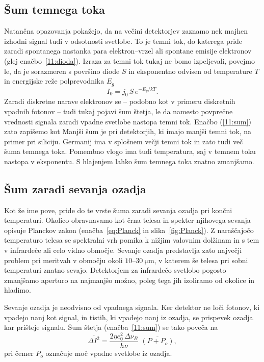\subsection*{Šum temnega toka} 
Natančna opazovanja pokažejo, da na večini detektorjev zaznamo nek majhen izhodni 
signal tudi v odsotnosti svetlobe. 
To je temni tok, do katerega pride zaradi
spontanega nastanka para elektron--vrzel ali spontane emisije elektronov 
(glej enačbo~\ref{11:dioda}). Izraza za temni tok tukaj ne bomo izpeljevali,
povejmo le, da je sorazmeren s površino diode $S$ in 
eksponentno odvisen od temperature $T$ in energijske reže polprevodnika $E_g$
\begin{equation}
I_0 = j_0\, S\, e^{-E_g/kT}.
\end{equation}
Zaradi diskretne narave elektronov se -- podobno
kot v primeru diskretnih vpadnih fotonov -- tudi tukaj pojavi šum štetja, le da 
namesto povprečne vrednosti signala zaradi vpadne svetlobe nastopa temni tok. 
Enačbo (\ref{11:sum}) zato zapišemo kot 
Manjši šum je pri detektorjih, ki imajo manjši temni tok, na primer pri siliciju.
Germanij  ima v splošnem večji temni tok in zato tudi več šuma temnega toka. Pomembno
vlogo ima tudi temperatura, saj v temnem toku nastopa v eksponentu. S hlajenjem lahko 
šum temnega toka znatno zmanjšamo. 

\subsection*{Šum zaradi sevanja ozadja}
Kot že ime pove, pride do te vrste šuma zaradi sevanja ozadja pri končni temperaturi.
Okolico obravnavamo kot črna telesa 
in spekter njihovega sevanja opisuje Planckov 
zakon (enačba~\ref{eq:Planck} in slika~\ref{fig:Planck}). Z naraščajočo temperaturo telesa se 
spektralni vrh pomika k nižjim valovnim dolžinam in s tem 
v infrardeče ali celo 
vidno območje. Sevanje ozadja predstavlja zato največji problem pri meritvah v
območju okoli $10$--$30~\si{\micro\meter}$, v katerem še telesa pri sobni temperaturi 
znatno sevajo. Detektorjem za infrardečo svetlobo pogosto zmanjšamo aperturo 
na najmanjšo možno, poleg tega jih izoliramo od okolice in hladimo. 

Sevanje ozadja je neodvisno od vpadnega signala. Ker detektor ne loči fotonov, ki 
vpadejo nanj kot signal, in tistih, ki vpadejo nanj iz ozadja, se prispevek ozadja 
kar prišteje signalu. Šum štetja (enačba~\ref{11:sum}) se tako poveča na
\begin{equation}
\overline{\Delta I^2} = \frac{2 \eta e_0^2\, \Delta\nu_B}{h\nu}\,\,
\overline{\left( P + P_o \right)},
\label{11:ozadje}
\end{equation}
pri čemer $P_o$ označuje moč vpadne svetlobe iz ozadja.

